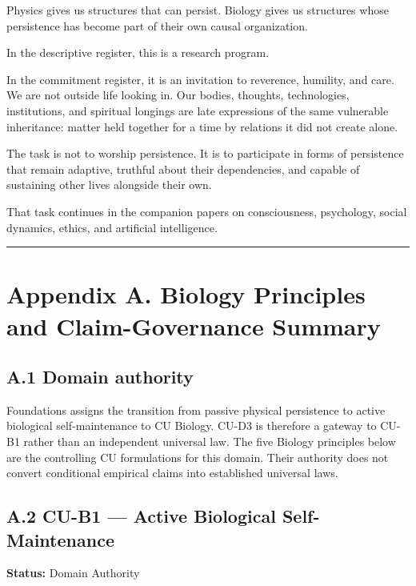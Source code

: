 \documentclass[
  11pt,
]{article}
\begin{document}
Physics gives us structures that can persist. Biology gives us
structures whose persistence has become part of their own causal
organization.

In the descriptive register, this is a research program.

In the commitment register, it is an invitation to reverence, humility,
and care. We are not outside life looking in. Our bodies, thoughts,
technologies, institutions, and spiritual longings are late expressions
of the same vulnerable inheritance: matter held together for a time by
relations it did not create alone.

The task is not to worship persistence. It is to participate in forms of
persistence that remain adaptive, truthful about their dependencies, and
capable of sustaining other lives alongside their own.

That task continues in the companion papers on consciousness,
psychology, social dynamics, ethics, and artificial intelligence.

\begin{center}\rule{0.5\linewidth}{0.5pt}\end{center}

\section{Appendix A. Biology Principles and Claim-Governance
Summary}\label{appendix-a.-biology-principles-and-claim-governance-summary}

\subsection{A.1 Domain authority}\label{a.1-domain-authority}

Foundations assigns the transition from passive physical persistence to
active biological self-maintenance to CU Biology. CU-D3 is therefore a
gateway to CU-B1 rather than an independent universal law. The five
Biology principles below are the controlling CU formulations for this
domain. Their authority does not convert conditional empirical claims
into established universal laws.

\subsection{A.2 CU-B1 --- Active Biological
Self-Maintenance}\label{a.2-cu-b1-active-biological-self-maintenance}

\textbf{Status:} Domain Authority
\end{document}
